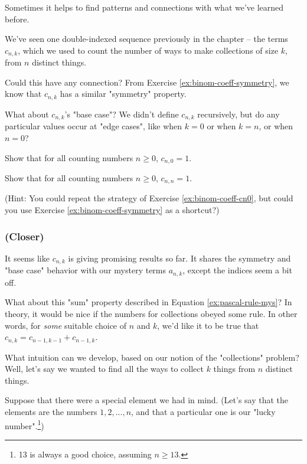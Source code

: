 Sometimes it helps to find patterns and connections with what we've learned before. 

We've seen one double-indexed sequence previously in the chapter -- the terms $c_{n,k}$, which we used to count the number of ways to make collections of size $k$, from $n$ distinct things.

Could this have any connection? From Exercise \ref{ex:binom-coeff-symmetry}, we know that $c_{n,k}$ has a similar "symmetry" property. 

What about $c_{n,k}$'s "base case"? We didn't define $c_{n,k}$ recursively, but do any particular values occur at "edge cases", like when $k = 0$ or when $k = n$, or when $n = 0$?

\begin{exercise}
\label{ex:binom-coeff-cn0}
Show that for all counting numbers $n \geq 0$, $c_{n,0} = 1$.
\end{exercise}

\begin{exercise}
Show that for all counting numbers $n \geq 0$, $c_{n,n} = 1$.

(Hint: You could repeat the strategy of Exercise \ref{ex:binom-coeff-cn0}, but could you use Exercise \ref{ex:binom-coeff-symmetry} as a shortcut?)
\end{exercise}


\subsubsection{(Closer)} 

It seems like $c_{n,k}$ is giving promising results so far. It shares the symmetry and "base case" behavior with our mystery terms $a_{n,k}$, except the indices seem a bit off.


What about this "sum" property described in Equation \ref{ex:pascal-rule-mys}? In theory, it would be nice if the numbers for collections obeyed some rule. In other words, for \emph{some} suitable choice of $n$ and $k$, we'd like it to be true that $c_{n,k} = c_{n-1,k-1} + c_{n-1,k}$.

What intuition can we develop, based on our notion of the "collections" problem? Well, let's say we wanted to find all the ways to collect $k$ things from $n$ distinct things. 

Suppose that there were a special element we had in mind. (Let's say that the elements are the numbers $1, 2, ..., n$, and that a particular one is our "lucky number".\footnote{13 is always a good choice, assuming $n \geq 13$.})

